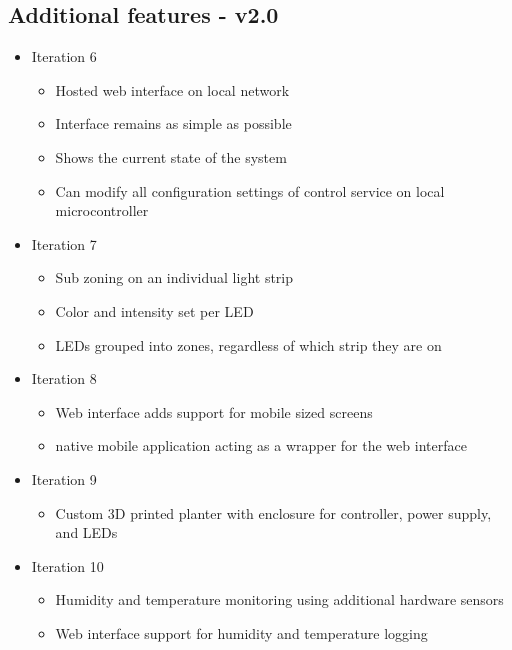 \documentclass[onecolumn, draftclsnofoot,10pt, compsoc]{IEEEtran}
\begin{document}
		\subsection{Additional features - v2.0}
			\begin{itemize}
				\item Iteration 6
					\begin{itemize}
						\item Hosted web interface on local network
						\item Interface remains as simple as possible
						\item Shows the current state of the system
						\item Can modify all configuration settings of control service on local microcontroller
					\end{itemize}
				\item Iteration 7
					\begin{itemize}
						\item Sub zoning on an individual light strip
						\item Color and intensity set per LED
						\item LEDs grouped into zones, regardless of which strip they are on
					\end{itemize}
				\item Iteration 8
					\begin{itemize}
						\item Web interface adds support for mobile sized screens
						\item native mobile application acting as a wrapper for the web interface
					\end{itemize}
				\item Iteration 9
					\begin{itemize}
						\item Custom 3D printed planter with enclosure for controller, power supply, and LEDs
					\end{itemize}
				\item Iteration 10
					\begin{itemize}
						\item Humidity and temperature monitoring using additional hardware sensors
						\item Web interface support for humidity and temperature logging
					\end{itemize}
			\end{itemize}
\end{document}
